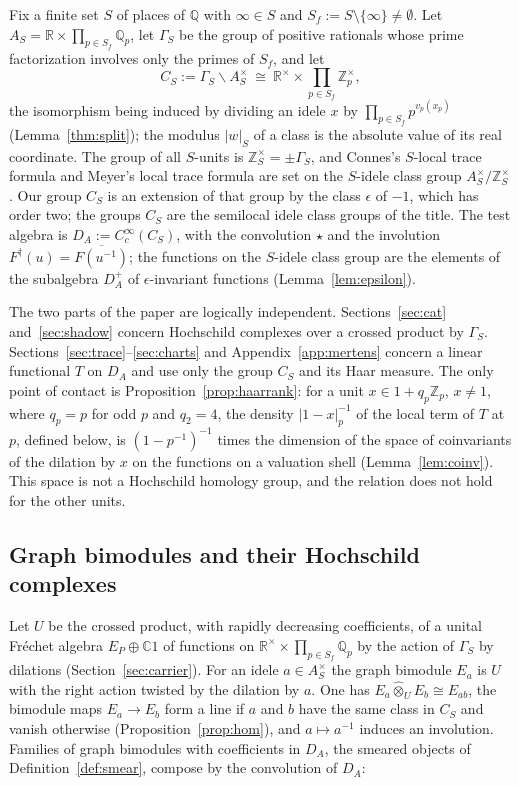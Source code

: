 \documentclass[11pt]{amsart}
\theoremstyle{definition}
\theoremstyle{remark}
\newcommand{\C}{\mathbb C}
\newcommand{\R}{\mathbb R}
\newcommand{\Z}{\mathbb Z}
\newcommand{\Q}{\mathbb Q}
\begin{document}
Fix a finite set $S$ of places of $\Q$ with $\infty\in S$ and
$S_f:=S\setminus\{\infty\}\ne\emptyset$.  Let
$A_S=\R\times\prod_{p\in S_f}\Q_p$, let $\Gamma_S$ be the group of positive
rationals whose prime factorization involves only the primes of $S_f$, and
let
\[
C_S:=\Gamma_S\backslash A_S^{\times}\ \cong\
\R^{\times}\times\prod_{p\in S_f}\Z_p^{\times},
\]
the isomorphism being induced by dividing an idele $x$ by
$\prod_{p\in S_f}p^{v_p(x_p)}$ (Lemma~\ref{thm:split}); the modulus
$|w|_S$ of a class is the absolute value of its real coordinate.  The group of
all $S$-units is $\Z_S^{\times}=\pm\Gamma_S$, and Connes's $S$-local trace
formula \cite[Section~VII]{Connes99} and Meyer's local trace formula
\cite[Section~3]{MeyerIdele} are set on the $S$-idele class group
$A_S^{\times}/\Z_S^{\times}$.  Our group $C_S$ is an extension of that group
by the class $\epsilon$ of $-1$, which has order two; the groups $C_S$ are
the semilocal idele class groups of the title.  The test algebra is
$D_A:=C_c^{\infty}(C_S)$, with the convolution $\star$ and the involution
$F^{\dagger}(u)=\overline{F(u^{-1})}$; the functions on the $S$-idele class
group are the elements of the subalgebra $D_A^{+}$ of $\epsilon$-invariant
functions (Lemma~\ref{lem:epsilon}).

The two parts of the paper are logically independent.
Sections~\ref{sec:cat} and~\ref{sec:shadow} concern Hochschild complexes over
a crossed product by $\Gamma_S$.  Sections~\ref{sec:trace}--\ref{sec:charts}
and Appendix~\ref{app:mertens} concern a linear functional $T$ on $D_A$ and
use only the group $C_S$ and its Haar measure.  The only point of contact is
Proposition~\ref{prop:haarrank}: for a unit $x\in1+q_p\Z_p$, $x\ne1$, where
$q_p=p$ for odd $p$ and $q_2=4$, the density $|1-x|_p^{-1}$ of the local term
of $T$ at $p$, defined below, is
$(1-p^{-1})^{-1}$ times the dimension of the space of coinvariants of the
dilation by $x$ on the functions on a valuation shell
(Lemma~\ref{lem:coinv}).  This space is not a Hochschild homology group, and
the relation does not hold for the other units.

\subsection*{Graph bimodules and their Hochschild complexes}

Let $U$ be the crossed product, with rapidly decreasing coefficients, of a
unital Fr\'echet algebra $E_P\oplus\C1$ of functions on
$\R^{\times}\times\prod_{p\in S_f}\Q_p$ by the action of $\Gamma_S$ by
dilations (Section~\ref{sec:carrier}).  For an idele $a\in A_S^{\times}$ the
graph bimodule $E_a$ is $U$ with the right action twisted by the dilation by
$a$.  One has $E_a\widehat\otimes_UE_b\cong E_{ab}$, the bimodule maps
$E_a\to E_b$ form a line if $a$ and $b$ have the same class in $C_S$ and
vanish otherwise (Proposition~\ref{prop:hom}), and $a\mapsto a^{-1}$ induces
an involution.  Families of graph bimodules with coefficients in $D_A$, the
smeared objects of Definition~\ref{def:smear}, compose by the convolution of
$D_A$:
\end{document}
